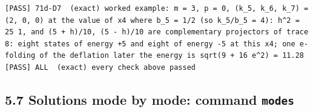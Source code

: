 \documentclass[
  10pt,
]{article}
\begin{document}
\begin{verbatim}
[PASS] 71d-D7  (exact) worked example: m = 3, p = 0, (k_5, k_6, k_7) = (2, 0, 0) at the value of x4 where b_5 = 1/2 (so k_5/b_5 = 4): h^2 = 25 1, and (5 + h)/10, (5 - h)/10 are complementary projectors of trace 8: eight states of energy +5 and eight of energy -5 at this x4; one e-folding of the deflation later the energy is sqrt(9 + 16 e^2) = 11.28
[PASS] ALL  (exact) every check above passed
\end{verbatim}

\hypertarget{solutions-mode-by-mode-command-modes}{%
\subsection{\texorpdfstring{5.7 Solutions mode by mode: command
\texttt{modes}}{5.7 Solutions mode by mode: command modes}}\label{solutions-mode-by-mode-command-modes}}
\end{document}
